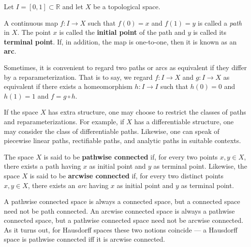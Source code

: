 \documentclass{article}
\begin{document}
Let $I=[0,1] \subset \mathbb{R}$ and let $X$ be a topological space.

A continuous map $f:I\rightarrow X$ such that $f(0)=x$ and $f(1)=y$ is called a \emph{path} in $X$.  The point $x$ is called the {\bf initial point} of the path and $y$ is called its {\bf terminal point}.  If, in addition, the map is one-to-one, then it is known as an {\bf arc}.

Sometimes, it is convenient to regard two paths or arcs as equivalent if they differ by a reparameterization.  That is to say, we regard $f \colon I \to X$ and $g \colon I \to X$ as equivalent if there exists a homeomorphism $h \colon I \to I$ such that $h(0) = 0$ and $h(1) = 1$ and $f = g \circ h$.

If the space $X$ has extra structure, one may choose to restrict the classes of paths and reparameterizations.  For example, if $X$ has a differentiable structure, one may consider the class of differentiable paths.  Likewise, one can speak of piecewise linear paths, rectifiable paths, and analytic paths in suitable contexts.

The space $X$ is said to be {\bf pathwise connected} if, for every two points $x, y \in X$, there exists a path having $x$ as initial point and $y$ as terminal point.  Likewise, the space $X$ is said to be {\bf arcwise connected} if, for every two distinct points $x, y \in X$, there exists an \emph{arc} having $x$ as initial point and $y$ as terminal point.  

A pathwise connected space is always a connected space, but a connected space need not be path connected.  An arcwise connected space is always a pathwise connected space, but a pathwise connected space need not be arcwise connected.
As it turns out, for Hausdorff spaces these two notions coincide --- a Hausdorff space is pathwise connected iff it is arcwise connected.
\end{document}
